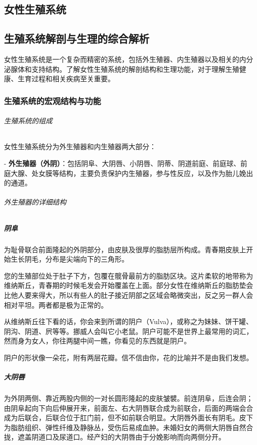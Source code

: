 \begin{enumerate}
\chapter{女性生殖系统}

\section{生殖系统解剖与生理的综合解析}

女性生殖系统是一个复杂而精密的系统，包括外生殖器、内生殖器以及相关的内分泌腺体和支持结构。了解女性生殖系统的解剖结构和生理功能，对于理解生殖健康、生育过程和相关疾病至关重要。

\subsection{生殖系统的宏观结构与功能}

\subparagraph{生殖系统的组成}

女性生殖系统分为外生殖器和内生殖器两大部分：

- \textbf{外生殖器（外阴）}：包括阴阜、大阴唇、小阴唇、阴蒂、阴道前庭、前庭球、前庭大腺、处女膜等结构，主要负责保护内生殖器，参与性反应，以及作为胎儿娩出的通道。

\subparagraph{外生殖器的详细结构}

\paragraph{阴阜}
为耻骨联合前面隆起的外阴部分，由皮肤及很厚的脂肪层所构成。青春期皮肤上开始生长阴毛，分布是尖端向下的三角形。

您的生殖部位处于肚子下方，包覆在髋骨最前方的脂肪区块。这片柔软的地带称为维纳斯丘，青春期的时候毛发会开始覆盖在上面。部分女性在维纳斯丘的脂肪垫会比他人要来得大，所以有些人的肚子接近阴部之区域会略微突出，反之另一群人会相对平坦。两者都是极为正常的。

从维纳斯丘往下看的话，你会来到所谓的阴户（Vulva），或称之为妹妹、饼干罐、阴沟、阴道、屄等等。挪威人会叫它小老鼠。阴户可能不是世界上最常用的词汇，然而身为女人，你往两腿中间一瞧，你看见的东西就是阴户。

阴户的形状像一朵花，附有两层花瓣。信不信由你，花的比喻并不是由我们发想。

\paragraph{大阴唇}
为外阴两侧、靠近两股内侧的一对长圆形隆起的皮肤皱襞。前连阴阜，后连会阴；由阴阜起向下向后伸展开来，前面左、右大阴唇联合成为前联合，后面的两端会合成为后联合，后联合位于肛门前，但不如前联合明显。大阴唇外面长有阴毛。皮下为脂肪组织、弹性纤维及静脉丛，受伤后易成血肿。未婚妇女的两侧大阴唇自然合拢，遮盖阴道口及尿道口。经产妇的大阴唇由于分娩影响而向两侧分开。


\end{enumerate}
